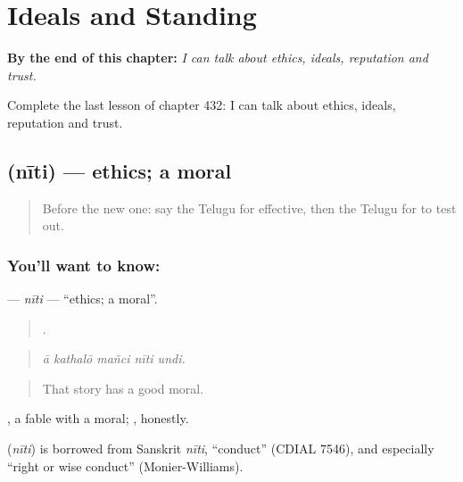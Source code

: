 
\chapter{Ideals and Standing}
\label{ch:te-ideals-and-standing}

\begin{chapteropening}
\textbf{By the end of this chapter:} \emph{I can talk about ethics, ideals, reputation and trust.}

Complete the last lesson of chapter 432: I can talk about ethics, ideals, reputation and trust.
\end{chapteropening}

\section[\texorpdfstring{\te{నీతి} (nīti)}{నీతి (nīti)}]{ (nīti) — ethics; a moral}

\label{lesson:TE-C432-niti}



\begin{quote}
Before the new one: say the Telugu for effective, then the Telugu for to test out.
\end{quote}

\subsection*{You'll want to know: }
\textbf{} — \emph{nīti} — \textquotedblleft{}ethics; a moral\textquotedblright{}.

\begin{quote}
    .
\end{quote}

\begin{quote}
\emph{ā kathalō mañci nīti undi.}
\end{quote}

\begin{quote}
That story has a good moral.
\end{quote}

 , a fable with a moral; , honestly.

\begin{cousinweb}
\textbf{} (\emph{nīti}) is borrowed from Sanskrit \emph{nīti}, \textquotedblleft{}conduct\textquotedblright{} (CDIAL 7546), and especially \textquotedblleft{}right or wise conduct\textquotedblright{} (Monier-Williams).
\end{cousinweb}

